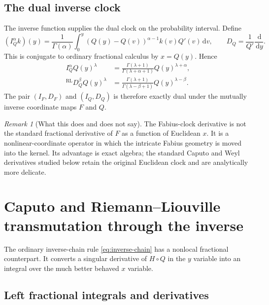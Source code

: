 \documentclass[11pt,oneside]{article}
\numberwithin{equation}{section}
\theoremstyle{plain}
\theoremstyle{definition}
\theoremstyle{remark}
\newtheorem{remark}[theorem]{Remark}
\newcommand{\dd}{\,\mathrm d}
\begin{document}
\subsection{The dual inverse clock}

The inverse function supplies the dual clock on the probability interval.
Define
\begin{equation}
 (I_Q^\alpha k)(y)
 =\frac1{\Gamma(\alpha)}
  \int_0^y(Q(y)-Q(v))^{\alpha-1}k(v)Q'(v)\dd v,
 \qquad
 D_Q=\frac1{Q'}\frac{\dd}{\dd y}.
 \label{eq:IQ-DQ}
\end{equation}
This is conjugate to ordinary fractional calculus by $x=Q(y)$.  Hence
\begin{align}
 I_Q^\alpha Q(y)^\lambda
 &=\frac{\Gamma(\lambda+1)}{\Gamma(\lambda+\alpha+1)}
 Q(y)^{\lambda+\alpha},
 \label{eq:Q-clock-power-I}\\
 {}^{\mathrm{RL}}D_Q^\beta Q(y)^\lambda
 &=\frac{\Gamma(\lambda+1)}{\Gamma(\lambda-\beta+1)}
 Q(y)^{\lambda-\beta}.
 \label{eq:Q-clock-power-D}
\end{align}
The pair $(I_F,D_F)$ and $(I_Q,D_Q)$ is therefore exactly dual under the
mutually inverse coordinate maps $F$ and $Q$.

\begin{remark}[What this does and does not say]
The Fabius-clock derivative is not the standard fractional derivative of
$F$ as a function of Euclidean $x$.  It is a nonlinear-coordinate operator in
which the intricate Fabius geometry is moved into the kernel.  Its advantage
is exact algebra; the standard Caputo and Weyl derivatives studied below
retain the original Euclidean clock and are analytically more delicate.
\end{remark}

\section{Caputo and Riemann--Liouville transmutation through the inverse}
\label{sec:inverse-transmutation}

The ordinary inverse-chain rule \cref{eq:inverse-chain} has a nonlocal
fractional counterpart.  It converts a singular derivative of $H\circ Q$ in
the $y$ variable into an integral over the much better behaved $x$ variable.

\subsection{Left fractional integrals and derivatives}
\end{document}
